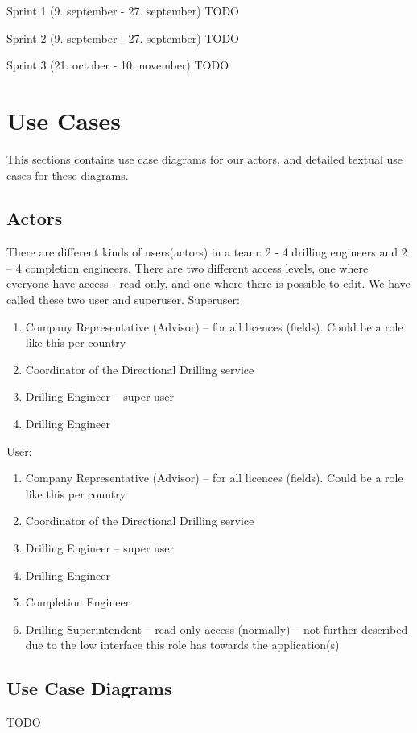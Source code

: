 \documentclass{report}
\begin{document}
Sprint 1 (9. september - 27. september)
TODO

Sprint 2 (9. september - 27. september)
TODO

Sprint 3 (21. october - 10. november)
TODO

\section{Use Cases} \label{sec:use_cases}
This sections contains use case diagrams for our actors, and detailed textual use cases for these diagrams. 
\subsection{Actors} \label{subsec:actors}
There are different kinds of users(actors) in a team: 2 - 4 drilling engineers and 2 – 4 completion engineers. There are two different access levels, one where everyone have access - read-only, and one where there is possible to edit. We have called these two user and superuser.
Superuser:
\begin{enumerate}
    \item Company Representative (Advisor) – for all licences (fields). Could be a role like this per country
    \item Coordinator of the Directional Drilling service
    \item Drilling Engineer – super user
    \item Drilling Engineer
\end{enumerate}
User:
\begin{enumerate}
    \item Company Representative (Advisor) – for all licences (fields). Could be a role like this per country
    \item Coordinator of the Directional Drilling service
    \item Drilling Engineer – super user
    \item Drilling Engineer
    \item Completion Engineer
    \item Drilling Superintendent – read only access (normally) – not further described due to the low interface this role has towards the application(s)
\end{enumerate}

\subsection{Use Case Diagrams} \label{subsec:use_case_diagrams}
TODO
\end{document}
